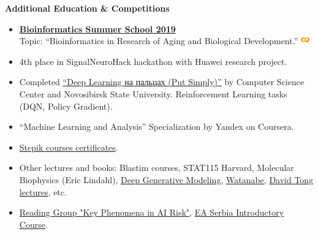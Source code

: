 \documentclass[12pt]{article}
\begin{document}
\noindent \textbf{\Large Additional Education \& Competitions}
\begin{itemize}
    \item \href{https://bioinf.me/education/summer/2019}{\textbf{Bioinformatics Summer School 2019}} \\
          Topic: “Bioinformatics in Research of Aging and Biological Development.” \href{https://docs.google.com/presentation/d/12X9N3eo9C5_c6ys-fudM9NPqtLNOq7waT3EI_VHpk_8/edit?usp=sharing}{\faChalkboardTeacher} \href{https://colab.research.google.com/drive/1oeGpQUsOl7thfNZp0QWXT5PVvh8-RbF8?usp=sharing}{\includegraphics[height=1em]{google-colab-logo.png}}

    \item 4th place in SignalNeuroHack hackathon with Huawei research project. \href{https://github.com/eluator/SignalNeuroHackTasks}{\faGithub}
    \item Completed \href{https://dlcourse.ai}{“Deep Learning на пальцах (Put Simply)”} by Computer Science Center and Novosibirsk State University. \href{https://github.com/eluator/dlcourse_ai}{\faGithub} Reinforcement Learning tasks (DQN, Policy Gradient).  \href{https://github.com/eluator/JetBrainsInternship}{\faGithub}
    \item “Machine Learning and Analysis” Specialization by Yandex on Coursera. \href{https://github.com/eluator/Coursera_ML}{\faGithub}
    \item \href{https://stepik.org/users/19741243/certificates}{Stepik courses certificates}.
    \item Other lectures and books: Blastim courses, STAT115 Harvard, Molecular Biophysics (Eric Lindahl), \href{https://link.springer.com/book/10.1007/978-3-030-93158-2}{Deep Generative Modeling}, \href{https://www.amazon.com/Algebraic-Statistical-Monographs-Computational-Mathematics/dp/0521864674/ref=sr_1_1?dib=eyJ2IjoiMSJ9.tkLNU_LnXzjo49nLudxBHTXgdSUji9_CDh8zIkf9eCNvsNrFQaIWdoEvn0XHpA2RrMEOWYmMgClofNKBNuugcUyAIhpemShvdfqTQcb8C1dGB0gnYam5WTp_IljQ1qbXZ4_4eejJPBanxVeKXy7XRvZ0QZG5AfHUOfc_w4rJE4_mrQYTHFq40KvTw2OobJbxZwgS0VQ9FOR-hBol-1ol7-zVnsjPFafUT9knUSpWxyI.fIl8H9UcscDCXG7cs5jBfaYT9ZVPPOnZacK73pkM0G4&dib_tag=se&qid=1735428125&refinements=p_27%3ASumio+Watanabe&s=books&sr=1-1}{Watanabe}, \href{https://www.damtp.cam.ac.uk/user/tong/teaching.html}{David Tong lectures}, etc.
    \item \href{https://www.alignmentforum.org/posts/vakhhNHduW9gmENTW/announcing-new-round-of-key-phenomena-in-ai-risk-reading}{Reading Group "Key Phenomena in AI Risk"}, 
          \href{https://www.linkedin.com/posts/effective-altruism-serbia_easerbia-makedifference-effectivealtruism-activity-7046076217321566208-SMq2/}{EA Serbia Introductory Course}.
\end{itemize}
\end{document}
